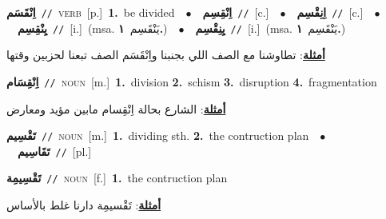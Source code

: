\documentclass[10pt,a4paper,twoside]{article} %
\begin{document}
\begin{multicols}{2}
{\setlength\topsep{0pt}\textbf{\foreignlanguage{arabic}{اِنْقَسَم}}\ {\color{gray}\texttt{//}\color{black}}\ \textsc{verb}\ [p.]\ \textbf{1.}~be divided\ \ $\bullet$\ \ \setlength\topsep{0pt}\textbf{\foreignlanguage{arabic}{اِنْقِسِم}}\ {\color{gray}\texttt{//}\color{black}}\ [c.]\ \ $\bullet$\ \ \setlength\topsep{0pt}\textbf{\foreignlanguage{arabic}{اِنِقْسِم}}\ {\color{gray}\texttt{//}\color{black}}\ [c.]\ \ $\bullet$\ \ \setlength\topsep{0pt}\textbf{\foreignlanguage{arabic}{يِنْقِسِم}}\ {\color{gray}\texttt{//}\color{black}}\ [i.]\ \color{gray}(msa. \foreignlanguage{arabic}{يَنْقَسِم}~\foreignlanguage{arabic}{\textbf{١.}})\color{black}\ \ $\bullet$\ \ \setlength\topsep{0pt}\textbf{\foreignlanguage{arabic}{يِنِقْسِم}}\ {\color{gray}\texttt{//}\color{black}}\ [i.]\ \color{gray}(msa. \foreignlanguage{arabic}{يَنْقَسِم}~\foreignlanguage{arabic}{\textbf{١.}})\color{black}\  \begin{flushright}\color{gray}\foreignlanguage{arabic}{\textbf{\underline{\foreignlanguage{arabic}{أمثلة}}}: تطاوشنا مع الصف اللي بجنبنا واِنْقَسَم الصف تبعنا لحزبين وقتها}\end{flushright}\color{black}} \vspace{2mm}

{\setlength\topsep{0pt}\textbf{\foreignlanguage{arabic}{اِنْقِسَام}}\ {\color{gray}\texttt{//}\color{black}}\ \textsc{noun}\ [m.]\ \textbf{1.}~division  \textbf{2.}~schism  \textbf{3.}~disruption  \textbf{4.}~fragmentation\  \begin{flushright}\color{gray}\foreignlanguage{arabic}{\textbf{\underline{\foreignlanguage{arabic}{أمثلة}}}: الشارع بحالة اِنْقِسام مابين مؤيد ومعارض}\end{flushright}\color{black}} \vspace{2mm}

{\setlength\topsep{0pt}\textbf{\foreignlanguage{arabic}{تَقْسِيم}}\ {\color{gray}\texttt{//}\color{black}}\ \textsc{noun}\ [m.]\ \textbf{1.}~dividing sth.  \textbf{2.}~the contruction plan\ \ $\bullet$\ \ \setlength\topsep{0pt}\textbf{\foreignlanguage{arabic}{تَقَاسِيم}}\ {\color{gray}\texttt{//}\color{black}}\ [pl.]\ } \vspace{2mm}

{\setlength\topsep{0pt}\textbf{\foreignlanguage{arabic}{تَقْسِيمِة}}\ {\color{gray}\texttt{//}\color{black}}\ \textsc{noun}\ [f.]\ \textbf{1.}~the contruction plan\  \begin{flushright}\color{gray}\foreignlanguage{arabic}{\textbf{\underline{\foreignlanguage{arabic}{أمثلة}}}: تَقْسيمِة دارنا غلط بالأساس}\end{flushright}\color{black}} \vspace{2mm}


\end{multicols}
\end{document}
